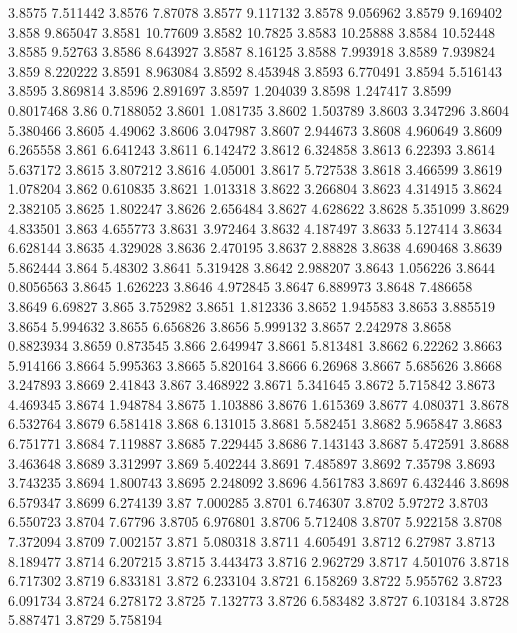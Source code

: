 3.8575  7.511442
3.8576  7.87078
3.8577  9.117132
3.8578  9.056962
3.8579  9.169402
3.858  9.865047
3.8581  10.77609
3.8582  10.7825
3.8583  10.25888
3.8584  10.52448
3.8585  9.52763
3.8586  8.643927
3.8587  8.16125
3.8588  7.993918
3.8589  7.939824
3.859  8.220222
3.8591  8.963084
3.8592  8.453948
3.8593  6.770491
3.8594  5.516143
3.8595  3.869814
3.8596  2.891697
3.8597  1.204039
3.8598  1.247417
3.8599  0.8017468
3.86  0.7188052
3.8601  1.081735
3.8602  1.503789
3.8603  3.347296
3.8604  5.380466
3.8605  4.49062
3.8606  3.047987
3.8607  2.944673
3.8608  4.960649
3.8609  6.265558
3.861  6.641243
3.8611  6.142472
3.8612  6.324858
3.8613  6.22393
3.8614  5.637172
3.8615  3.807212
3.8616  4.05001
3.8617  5.727538
3.8618  3.466599
3.8619  1.078204
3.862  0.610835
3.8621  1.013318
3.8622  3.266804
3.8623  4.314915
3.8624  2.382105
3.8625  1.802247
3.8626  2.656484
3.8627  4.628622
3.8628  5.351099
3.8629  4.833501
3.863  4.655773
3.8631  3.972464
3.8632  4.187497
3.8633  5.127414
3.8634  6.628144
3.8635  4.329028
3.8636  2.470195
3.8637  2.88828
3.8638  4.690468
3.8639  5.862444
3.864  5.48302
3.8641  5.319428
3.8642  2.988207
3.8643  1.056226
3.8644  0.8056563
3.8645  1.626223
3.8646  4.972845
3.8647  6.889973
3.8648  7.486658
3.8649  6.69827
3.865  3.752982
3.8651  1.812336
3.8652  1.945583
3.8653  3.885519
3.8654  5.994632
3.8655  6.656826
3.8656  5.999132
3.8657  2.242978
3.8658  0.8823934
3.8659  0.873545
3.866  2.649947
3.8661  5.813481
3.8662  6.22262
3.8663  5.914166
3.8664  5.995363
3.8665  5.820164
3.8666  6.26968
3.8667  5.685626
3.8668  3.247893
3.8669  2.41843
3.867  3.468922
3.8671  5.341645
3.8672  5.715842
3.8673  4.469345
3.8674  1.948784
3.8675  1.103886
3.8676  1.615369
3.8677  4.080371
3.8678  6.532764
3.8679  6.581418
3.868  6.131015
3.8681  5.582451
3.8682  5.965847
3.8683  6.751771
3.8684  7.119887
3.8685  7.229445
3.8686  7.143143
3.8687  5.472591
3.8688  3.463648
3.8689  3.312997
3.869  5.402244
3.8691  7.485897
3.8692  7.35798
3.8693  3.743235
3.8694  1.800743
3.8695  2.248092
3.8696  4.561783
3.8697  6.432446
3.8698  6.579347
3.8699  6.274139
3.87  7.000285
3.8701  6.746307
3.8702  5.97272
3.8703  6.550723
3.8704  7.67796
3.8705  6.976801
3.8706  5.712408
3.8707  5.922158
3.8708  7.372094
3.8709  7.002157
3.871  5.080318
3.8711  4.605491
3.8712  6.27987
3.8713  8.189477
3.8714  6.207215
3.8715  3.443473
3.8716  2.962729
3.8717  4.501076
3.8718  6.717302
3.8719  6.833181
3.872  6.233104
3.8721  6.158269
3.8722  5.955762
3.8723  6.091734
3.8724  6.278172
3.8725  7.132773
3.8726  6.583482
3.8727  6.103184
3.8728  5.887471
3.8729  5.758194
